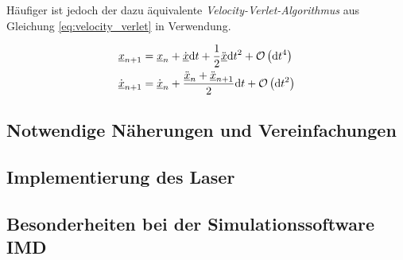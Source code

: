 		Häufiger ist jedoch der dazu äquivalente \emph{Velocity-Verlet-Algorithmus} aus Gleichung
		\eqref{eq:velocity_verlet} in Verwendung.

		\begin{align}
			\underline{x}_{n+1} &= \underline{x}_n + \dot{\underline{x}}\text{d} t
				+ \frac{1}{2}\ddot{\underline{x}}\text{d} t^2 + \operatorname{\mathcal{O}}\left(\text{d} t^4\right) \nonumber\\
			\dot{\underline{x}}_{n+1} &= \dot{\underline{x}}_n + \frac{\ddot{\underline{x}}_n +
				\ddot{\underline{x}}_{n+1}}{2}\text{d} t + \operatorname{\mathcal{O}}\left(\text{d} t^2\right)
				\label{eq:velocity_verlet}
		\end{align}

	\subsection{Notwendige Näherungen und Vereinfachungen}
	\subsection{Implementierung des Laser}
	\subsection{Besonderheiten bei der Simulationssoftware IMD}
